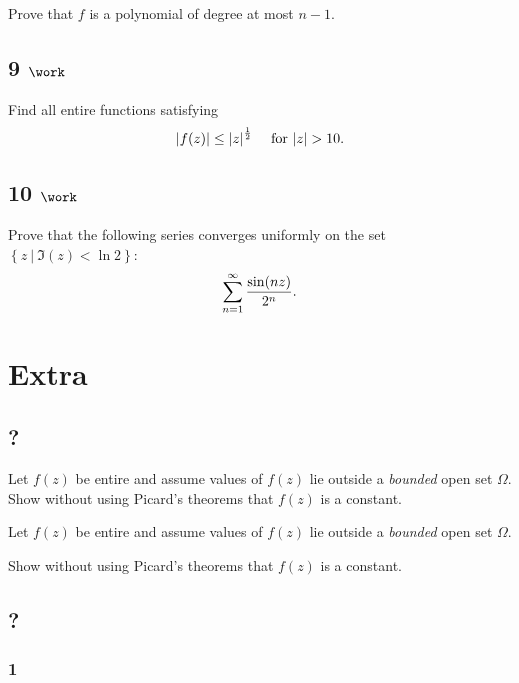 Prove that \(f\) is a polynomial of degree at most \(n-1\).

\hypertarget{work-28}{%
\subsection{\texorpdfstring{9
\(\work\)}{9 \textbackslash work}}\label{work-28}}

Find all entire functions satisfying
\begin{align*}
{\left\lvert {f(z)} \right\rvert} \leq {\left\lvert {z} \right\rvert}^{1\over 2} \quad\text{ for } {\left\lvert {z} \right\rvert} > 10
.\end{align*}

\hypertarget{work-29}{%
\subsection{\texorpdfstring{10
\(\work\)}{10 \textbackslash work}}\label{work-29}}

Prove that the following series converges uniformly on the set
\(\left\{{z {~\mathrel{\Big|}~}\Im(z) < \ln 2}\right\}\):
\begin{align*}
\sum_{n=1}^\infty {\sin(nz) \over 2^n}
.\end{align*}

\hypertarget{extra-1}{%
\section{Extra}\label{extra-1}}

\hypertarget{section-5}{%
\subsection{?}\label{section-5}}

Let \(f(z)\) be entire and assume values of \(f(z)\) lie outside a
\emph{bounded} open set \(\Omega\). Show without using Picard's theorems
that \(f(z)\) is a constant.

Let \(f(z)\) be entire and assume values of \(f(z)\) lie outside a
\emph{bounded} open set \(\Omega\).

Show without using Picard's theorems that \(f(z)\) is a constant.

\hypertarget{section-6}{%
\subsection{?}\label{section-6}}

\hypertarget{section-7}{%
\subsubsection{1}\label{section-7}}

